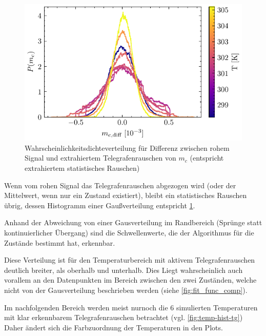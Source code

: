 \documentclass[main.tex]{subfiles}
\begin{document}
\begin{figure}[H]
    \centering
    \includegraphics{bilder/plots/temp_comparison_long/mc_diff_hist.pdf}
    \caption{Wahrscheinlichkeitsdichteverteilung für Differenz zwischen rohem Signal und extrahiertem Telegrafenrauschen von \(m_c\) (entspricht extrahiertem statistisches Rauschen)}\label{fig:temp-diff-hist}    
\end{figure}

Wenn vom rohen Signal das Telegrafenrauschen abgezogen wird (oder der Mittelwert, wenn nur ein Zustand existiert), bleibt ein statistisches Rauschen übrig, dessen Histogramm einer Gaußverteilung entspricht \cref{fig:temp-diff-hist}. 

Anhand der Abweichung von einer Gausverteilung im Randbereich (Sprünge statt kontinuierlicher Übergang) sind die Schwellenwerte, die der Algorithmus für die Zustände bestimmt hat, erkennbar.

Diese Verteilung ist für den Temperaturbereich mit aktivem Telegrafenrauschen deutlich breiter, als oberhalb und unterhalb. Dies Liegt wahrscheinlich auch vorallem an den Datenpunkten im Bereich zwischen den zwei Zuständen, welche nicht von der Gausverteilung beschrieben werden (siehe \cref{fig:fit_func_comp}).

Im nachfolgenden Bereich werden meist nurnoch die 6 simulierten Temperaturen mit klar erkennbarem Telegrafenrauschen betrachtet (vgl. \cref{fig:temp-hist-tg}) Daher ändert sich die Farbzuordnung der Temperaturen in den Plots.
\end{document}
